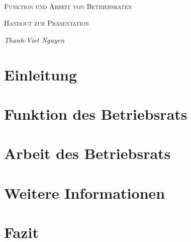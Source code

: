 \documentclass[
  a4paper,            %
  DIV=10,             %
  oneside,            %
  BCOR=5mm,           %
  parskip=half,       %
  numbers=noenddot    %
]{scrartcl}
\begin{document}
\begin{titlepage}
	\centering
	\text{}\vspace{3cm} \\
	{\scshape\LARGE Funktion und Arbeit von Betriebsräten \par}
	\vspace{1cm}
	{\scshape\Large 
		Handout zur Präsentation \par}
	\vspace{1.5cm}
	{\huge\bfseries \par}
	\vspace{2cm}
	{\Large\itshape     	
            Thanh-Viet Nguyen \\
            \par}
\vfill
\begingroup
{}		
        \textbf {} %
\endgroup
\end{titlepage}

    \tableofcontents
\clearpage


\section{Einleitung} \label{sec:intro}
    
\section{Funktion des Betriebsrats} 
    
\section{Arbeit des Betriebsrats} 
	
\section{Weitere Informationen}
	

\newpage

\section{Fazit} %
  
\end{document}
